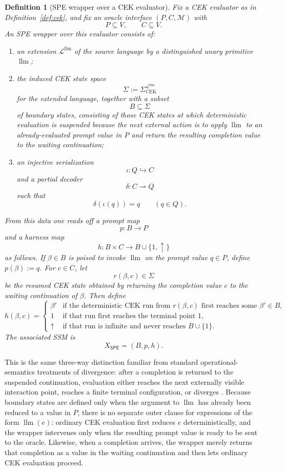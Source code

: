 \documentclass[11pt]{article}
\newtheorem{definition}{Definition}[section]
\newcommand{\SPE}{\mathsf{SPE}}
\newcommand{\llm}{\operatorname{llm}}
\begin{document}
\begin{definition}[SPE wrapper over a CEK evaluator]\label{def:spe}
Fix a CEK evaluator as in Definition~\ref{def:cek}, and fix an oracle interface $(P,C,\mathcal{M})$ with
\[
P\subseteq V,
\qquad
C\subseteq V.
\]
An \emph{SPE wrapper} over this evaluator consists of:
\begin{enumerate}[label=(\roman*)]
    \item an extension $\mathcal{L}^{\llm}$ of the source language by a distinguished unary primitive $\llm$;
    \item the induced CEK state space
    \[
    \Sigma:=\Sigma_{\mathrm{CEK}}^{\mathcal{L}^{\llm}}
    \]
    for the extended language, together with a subset
    \[
    B\subseteq \Sigma
    \]
    of \emph{boundary states}, consisting of those CEK states at which deterministic evaluation is suspended because the next external action is to apply $\llm$ to an already-evaluated prompt value in $P$ and return the resulting completion value to the waiting continuation;
    \item an injective serialization
    \[
    \iota:Q\hookrightarrow C
    \]
    and a partial decoder
    \[
    \delta:C\rightharpoonup Q
    \]
    such that
    \[
    \delta(\iota(q))=q
    \qquad(q\in Q).
    \]
\end{enumerate}
From this data one reads off a prompt map
\[
p:B\to P
\]
and a harness map
\[
h:B\times C\to B\cup\{1,\uparrow\}
\]
as follows. If $\beta\in B$ is poised to invoke $\llm$ on the prompt value $q\in P$, define $p(\beta):=q$. For $c\in C$, let
\[
r(\beta,c)\in \Sigma
\]
be the resumed CEK state obtained by returning the completion value $c$ to the waiting continuation of $\beta$. Then define
\[
h(\beta,c)=
\begin{cases}
\beta' & \text{if the deterministic CEK run from } r(\beta,c) \text{ first reaches some } \beta'\in B,\\
1 & \text{if that run first reaches the terminal point } 1,\\
\uparrow & \text{if that run is infinite and never reaches } B\cup\{1\}.
\end{cases}
\]
The associated SSM is
\[
X_{\SPE}=(B,p,h).
\]
\end{definition}

This is the same three-way distinction familiar from standard operational-semantics treatments of divergence: after a completion is returned to the suspended continuation, evaluation either reaches the next externally visible interaction point, reaches a finite terminal configuration, or diverges \cite{LeroyGrall09}. Because boundary states are defined only when the argument to $\llm$ has already been reduced to a value in $P$, there is no separate outer clause for expressions of the form $\llm(e)$: ordinary CEK evaluation first reduces $e$ deterministically, and the wrapper intervenes only when the resulting prompt value is ready to be sent to the oracle. Likewise, when a completion arrives, the wrapper merely returns that completion as a value in the waiting continuation and then lets ordinary CEK evaluation proceed.
\end{document}
